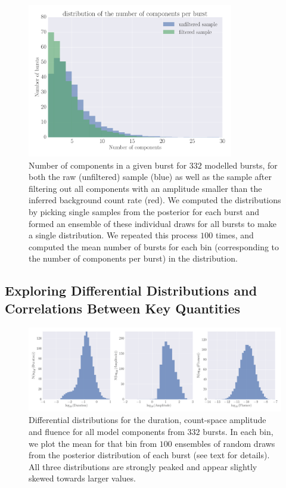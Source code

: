 \documentclass[12pt]{emulateapj}
\begin{document}
\begin{figure}[htbp]
\begin{center}
\includegraphics[width=9cm]{f4.pdf}%
\caption{Number of components in a given burst for $332$ modelled bursts, for both the raw (unfiltered) sample (blue) as well as the sample after
filtering out all components with an amplitude smaller than the inferred background count rate (red). We computed the distributions by picking single samples
from the posterior for each burst and formed an ensemble of these individual draws for all bursts to make a single distribution. We repeated this process $100$ times,
and computed the mean number of bursts for each bin (corresponding to the number of components per burst) in the distribution.}
\label{fig:spikes}
\end{center}
\end{figure}

\subsection{Exploring Differential Distributions and Correlations Between Key Quantities}
\label{ch6:exploration}
  \begin{figure}[htbp]
\begin{center}
\includegraphics[width=\textwidth]{f5.pdf}%
\caption{Differential distributions for the duration, count-space amplitude and fluence for all model components from $332$ bursts. In each bin, we plot the mean for
that bin from $100$ ensembles of random draws from the posterior distribution of each burst (see text for details). All three distributions are strongly peaked and appear slightly 
skewed towards larger values. }
\label{fig:diffdist}
\end{center}
\end{figure}
\end{document}
